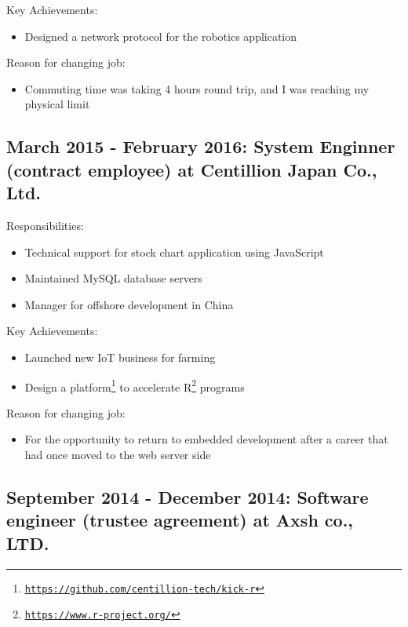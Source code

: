 \documentclass[letterpaper]{article}
\begin{document}
\noindent Key Achievements:

\begin{itemize}
  \item Designed a network protocol for the robotics application
\end{itemize}

\noindent Reason for changing job:

\begin{itemize}
  \item Commuting time was taking 4 hours round trip, and I was reaching my physical limit
\end{itemize}

\subsection*{March 2015 - February 2016: System Enginner (contract employee) at Centillion Japan Co., Ltd.}

\noindent Responsibilities:

\begin{itemize}
  \item Technical support for stock chart application using JavaScript
  \item Maintained MySQL database servers
  \item Manager for offshore development in China
\end{itemize}

\noindent Key Achievements:

\begin{itemize}
  \item Launched new IoT business for farming
  \item Design a platform\footnote{\href{https://github.com/centillion-tech/kick-r}{\tt https://github.com/centillion-tech/kick-r}} to accelerate R\footnote{\href{https://www.r-project.org/}{\tt https://www.r-project.org/}} programs
\end{itemize}

\noindent Reason for changing job:

\begin{itemize}
  \item For the opportunity to return to embedded development after a career that had once moved to the web server side
\end{itemize}

\subsection*{September 2014 - December 2014: Software engineer (trustee agreement) at Axsh co., LTD.}
\end{document}
